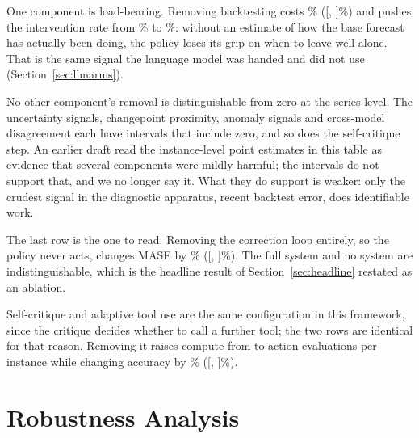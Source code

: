 \begin{table}[htbp]
\centering
\caption{Component ablations, replayed against the identical counterfactual tensor.
A positive $\Delta$ means removing the component made results worse. Intervals are
95\% series-level bootstrap against the full system; $\dagger$ marks one excluding
zero. Only one does.}
\label{tab:ablations}
\small
\fittable{}
\end{table}

One component is load-bearing. Removing backtesting costs \ablNoBacktestingSeries\%
([\ablNoBacktestingSeriesCIlo, \ablNoBacktestingSeriesCIhi]\%) and pushes the
intervention rate from \ablFullRate\% to \ablNoBacktestingRate\%: without an
estimate of how the base forecast has actually been doing, the policy loses its grip on
when to leave well alone. That is the same signal the language model was handed and did
not use (Section~\ref{sec:llmarms}).

No other component's removal is distinguishable from zero at the series level. The
uncertainty signals, changepoint proximity, anomaly signals and cross-model disagreement
each have intervals that include zero, and so does the self-critique step. An earlier
draft read the instance-level point estimates in this table as evidence that several
components were mildly harmful; the intervals do not support that, and we no longer say
it. What they do support is weaker: only the crudest signal in the diagnostic apparatus,
recent backtest error, does identifiable work.

The last row is the one to read. Removing the correction loop entirely, so the policy
never acts, changes MASE by \ablNoCorrectionLoopSeries\%
([\ablNoCorrectionLoopSeriesCIlo, \ablNoCorrectionLoopSeriesCIhi]\%). The full
system and no system are indistinguishable, which is the headline result of
Section~\ref{sec:headline} restated as an ablation.

Self-critique and adaptive tool use are the same configuration in this framework, since
the critique decides whether to call a further tool; the two rows are identical for that
reason. Removing it raises compute from \ablFullCompute{} to
\ablNoAdaptiveToolsCompute{} action evaluations per instance while changing accuracy by
\ablNoAdaptiveToolsSeries\% ([\ablNoAdaptiveToolsSeriesCIlo,
\ablNoAdaptiveToolsSeriesCIhi]\%).

\section{Robustness Analysis}
\label{sec:robustness}

